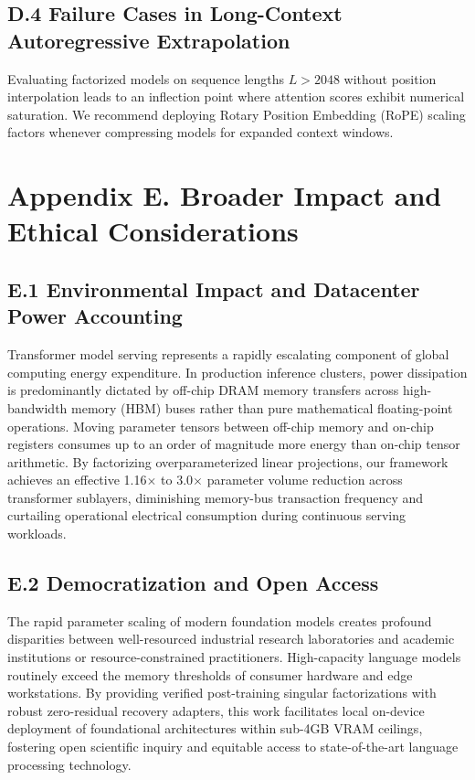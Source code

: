 \documentclass{article}
\begin{document}
\subsection*{D.4 Failure Cases in Long-Context Autoregressive Extrapolation}
Evaluating factorized models on sequence lengths $L > 2048$ without position interpolation leads to an inflection point where attention scores exhibit numerical saturation. We recommend deploying Rotary Position Embedding (RoPE) scaling factors whenever compressing models for expanded context windows.


\section*{Appendix E. Broader Impact and Ethical Considerations}

\subsection*{E.1 Environmental Impact and Datacenter Power Accounting}
Transformer model serving represents a rapidly escalating component of global computing energy expenditure. In production inference clusters, power dissipation is predominantly dictated by off-chip DRAM memory transfers across high-bandwidth memory (HBM) buses rather than pure mathematical floating-point operations. Moving parameter tensors between off-chip memory and on-chip registers consumes up to an order of magnitude more energy than on-chip tensor arithmetic. By factorizing overparameterized linear projections, our framework achieves an effective 1.16$\times$ to 3.0$\times$ parameter volume reduction across transformer sublayers, diminishing memory-bus transaction frequency and curtailing operational electrical consumption during continuous serving workloads.

\subsection*{E.2 Democratization and Open Access}
The rapid parameter scaling of modern foundation models creates profound disparities between well-resourced industrial research laboratories and academic institutions or resource-constrained practitioners. High-capacity language models routinely exceed the memory thresholds of consumer hardware and edge workstations. By providing verified post-training singular factorizations with robust zero-residual recovery adapters, this work facilitates local on-device deployment of foundational architectures within sub-4GB VRAM ceilings, fostering open scientific inquiry and equitable access to state-of-the-art language processing technology.
\end{document}

